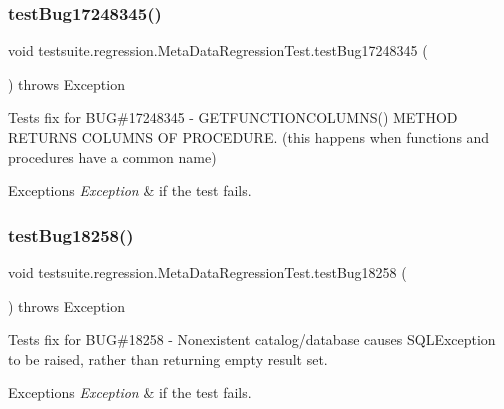 \subsubsection{\texorpdfstring{test\+Bug17248345()}{testBug17248345()}}
{\footnotesize\ttfamily void testsuite.\+regression.\+Meta\+Data\+Regression\+Test.\+test\+Bug17248345 (\begin{DoxyParamCaption}{ }\end{DoxyParamCaption}) throws Exception}

Tests fix for B\+UG\#17248345 -\/ G\+E\+T\+F\+U\+N\+C\+T\+I\+O\+N\+C\+O\+L\+U\+M\+N\+S() M\+E\+T\+H\+OD R\+E\+T\+U\+R\+NS C\+O\+L\+U\+M\+NS OF P\+R\+O\+C\+E\+D\+U\+RE. (this happens when functions and procedures have a common name)


\begin{DoxyExceptions}{Exceptions}
{\em Exception} & if the test fails. \\
\hline
\end{DoxyExceptions}
\mbox{\label{classtestsuite_1_1regression_1_1_meta_data_regression_test_af1076e63dffd2b6792697be0f509d039}} 
\subsubsection{\texorpdfstring{test\+Bug18258()}{testBug18258()}}
{\footnotesize\ttfamily void testsuite.\+regression.\+Meta\+Data\+Regression\+Test.\+test\+Bug18258 (\begin{DoxyParamCaption}{ }\end{DoxyParamCaption}) throws Exception}

Tests fix for B\+UG\#18258 -\/ Nonexistent catalog/database causes S\+Q\+L\+Exception to be raised, rather than returning empty result set.


\begin{DoxyExceptions}{Exceptions}
{\em Exception} & if the test fails. \\
\hline
\end{DoxyExceptions}
\mbox{\label{classtestsuite_1_1regression_1_1_meta_data_regression_test_ac00a7a14db2a9fd6e4c1439959c0a67d}} 
